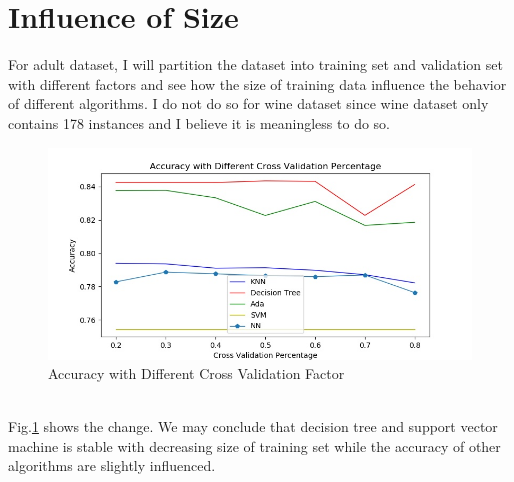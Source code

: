 \documentclass[11pt]{article}
\begin{document}
\section{Influence of Size}
For adult dataset, I will partition the dataset into training set and validation set with different factors and see how the size of training data influence the behavior of different algorithms. I do not do so for wine dataset since wine dataset only contains 178 instances and I believe it is meaningless to do so.
\begin{figure}[h!]
  \includegraphics[width=\linewidth]{./adult/compare.jpg}
  \caption{Accuracy with Different Cross Validation Factor}
  \label{fig:compare}
\end{figure}\\
Fig.\ref{fig:compare} shows the change. We may conclude that decision tree and support vector machine is stable with decreasing size of training set while the accuracy of other algorithms are slightly influenced.
\end{document}
